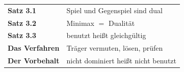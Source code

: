 \begin{merksatz}
\begin{center}
\renewcommand{\arraystretch}{1.5}
\begin{tabular}{@{}P{3.0cm}P{5.6cm}@{}}
\toprule
\textbf{Satz 3.1} & Spiel und Gegenspiel sind dual\\
\textbf{Satz 3.2} & Minimax $=$ Dualität\\
\textbf{Satz 3.3} & benutzt heißt gleichgültig\\
\textbf{Das Verfahren} & Träger vermuten, lösen, prüfen\\
\textbf{Der Vorbehalt} & nicht dominiert heißt nicht benutzt\\
\bottomrule
\end{tabular}
\end{center}

\begin{center}
\begin{minipage}{0.88\textwidth}
\end{minipage}
\end{center}
\end{merksatz}
